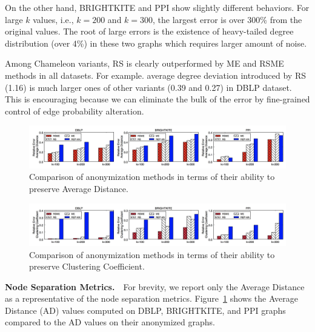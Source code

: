 On the other hand, BRIGHTKITE and PPI show slightly different behaviors. For large $k$ values, i.e., $k=200$ and $k=300$, the largest error is over 300\% from the original values. The root of large errors is the existence of heavy-tailed degree distribution (over 4\%) in these two graphs which requires larger amount of noise. 

Among Chameleon variants, RS is clearly outperformed by ME and RSME methods in all datasets. For example.  average degree deviation introduced by RS (1.16) is much larger ones of other variants (0.39 and 0.27) in DBLP dataset. This is encouraging because we can eliminate the bulk of the error by fine-grained control of edge probability alteration.   

\begin{figure}[!tb]
    \centering
    \vspace{-5pt}
    \includegraphics[width=\linewidth]{exp/exp_apd.jpg}
    \caption{Comparison of anonymization methods in terms of their ability to preserve Average Distance.}
    \label{fig:ex_apd}
    \vspace{-5pt}
\end{figure}

\begin{figure}[!tb]
    \centering
    \vspace{-5pt}
    \includegraphics[width=\linewidth]{exp/exp_cc.jpg}
    \caption{Comparison of anonymization methods in terms of their ability to preserve Clustering Coefficient.}
    \vspace{-5pt}
    \label{fig:ex_cc}
\end{figure}

\textbf{Node Separation Metrics.}~~For brevity, we report only the Average Distance as a representative of the node separation metrics. Figure~\ref{fig:ex_apd} shows the Average Distance (AD) values computed on DBLP, BRIGHTKITE, and PPI graphs compared to the AD values on their anonymized graphs.  

